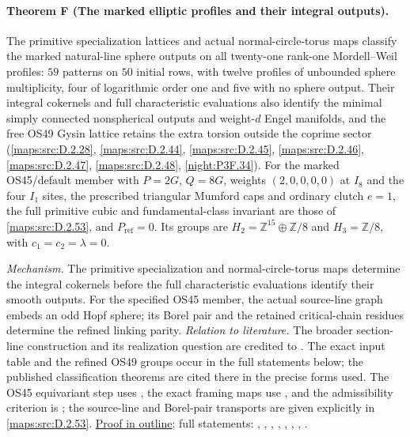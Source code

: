 \paragraph{Theorem F (The marked elliptic profiles and their integral outputs).}
\label{series:III:F}
The primitive specialization lattices and actual normal-circle-torus
maps classify the marked natural-line sphere outputs on all
twenty-one rank-one Mordell--Weil profiles: $59$ patterns on $50$
initial rows, with twelve profiles of unbounded sphere multiplicity,
four of logarithmic order one and five with no sphere output.
Their integral cokernels and full characteristic evaluations also
identify the minimal simply connected nonspherical outputs and
weight-$d$ Engel manifolds, and the free OS49 Gysin lattice retains
the extra torsion outside the coprime sector
(\cref{maps:src:D.2.28}, \cref{maps:src:D.2.44}, \cref{maps:src:D.2.45}, \cref{maps:src:D.2.46}, \cref{maps:src:D.2.47}, \cref{maps:src:D.2.48}, \cref{night:P3F.34}).
For the marked OS45/default member with $P=2G$, $Q=8G$,
weights $(2,0,0,0,0)$ at $I_8$ and the four $I_1$ sites,
the prescribed triangular Mumford caps and ordinary clutch $e=1$,
the full primitive cubic and fundamental-class invariant are those of
\cref{maps:src:D.2.53}, and $P_{\mathrm{ref}}=0$.
Its groups are $H_2=\mathbb Z^{15}\oplus\mathbb Z/8$ and
$H_3=\mathbb Z/8$, with $c_1=c_2=\lambda=0$.


\textit{Mechanism.} The primitive specialization and normal-circle-torus maps determine the integral cokernels before the full characteristic evaluations identify their smooth outputs. For the specified OS45 member, the actual source-line graph embeds an odd Hopf sphere; its Borel pair and the retained critical-chain residues determine the refined linking parity.
\textit{Relation to literature.} The broader section-line construction and its realization question are credited to \cite[Remark~8.5]{E26}. The exact input table and the refined OS49 groups occur in the full statements below; the published classification theorems are cited there in the precise forms used. The OS45 equivariant step uses \cite[Theorem~3.5, p.~8]{AtiyahBott1984}, the exact framing maps use \cite[Remark~2.17, p.~12; \S6.1, pp.~24--25]{Redden2011StringStructures}, and the admissibility criterion is \cite[Theorem~1, p.~6; \S5, pp.~8--9]{ffZhubr13}; the source-line and Borel-pair transports are given explicitly in \cref{maps:src:D.2.53}.
\hyperlink{outline-III-F}{Proof in outline}; full statements: , , , , , , , .


